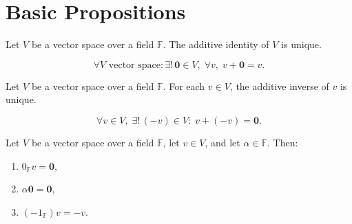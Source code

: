 
\section{Basic Propositions}

\begin{proposition}
\label{prop:unique-additive-identity}
Let $V$ be a vector space over a field $\mathbb{F}$.
The additive identity of $V$ is unique.
\end{proposition}

\begin{remark*}
\[ \forall V\text{ vector space}: \exists!\,\mathbf{0}\in V,\;\forall v,\;v+\mathbf{0}=v. \]
\end{remark*}

\begin{remark*}[Flash]
\end{remark*}



\begin{proposition}
\label{prop:unique-additive-inverse}
Let $V$ be a vector space over a field $\mathbb{F}$.
For each $v \in V$, the additive inverse of $v$ is unique.
\end{proposition}

\begin{remark*}
\[ \forall v\in V,\;\exists!\,(-v)\in V:\;v+(-v)=\mathbf{0}. \]
\end{remark*}

\begin{remark*}[Flash]
\end{remark*}  



\begin{proposition}
\label{prop:scalar-mult-zero}
Let $V$ be a vector space over a field $\mathbb{F}$,
let $v \in V$, and let $\alpha \in \mathbb{F}$. Then:
\begin{enumerate}
    \item $0_{\mathbb{F}} v = \mathbf{0}$,
    \item $\alpha \mathbf{0} = \mathbf{0}$,
    \item $(-1_{\mathbb{F}}) v = -v$.
\end{enumerate}
\end{proposition}


